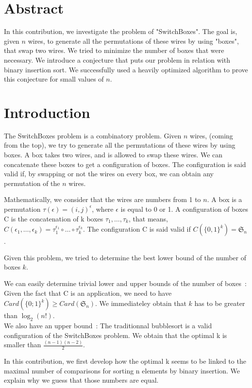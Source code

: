 \documentclass[11pt, a4paper]{article}
\begin{document}
\section{Abstract}
In this contribution, we investigate the problem of "SwitchBoxes".
The goal is, given $n$ wires, to generate all the permutations of these wires by using "boxes",
 that swap two wires. We tried to minimize the number of boxes that were necessary.
We introduce a conjecture that puts our problem in relation with binary insertion sort. 
We successfully used a heavily optimized algorithm to prove this conjecture for small values of $n$.

\section{Introduction}
The SwitchBoxes problem is a combinatory problem. Given $n$ wires, (coming from the top), 
we try to generate all the permutations of these wires by using boxes. 
A box takes two wires, and is allowed to swap these wires. We can concatenate these boxes to get a configuration of boxes.
The configuration is said valid if, by swapping or not the wires on every box, we can obtain any permutation of the $n$ wires.

Mathematically, we consider that the wires are numbers from 1 to $n$. A box is a permutation $\tau(\epsilon) = (i,j)^{\epsilon}$, where $\epsilon$ is equal to 0 or 1.
A configuration of boxes C is the concatenation of k boxes $\tau_1, \ldots, \tau_k$, that means, $C(\epsilon_1, \ldots, \epsilon_k) = \tau_1^{\epsilon_1}\circ\ldots\circ\tau_k^{\epsilon_k}$.
The configuration C is said valid if $C(\{0,1\}^k)= \mathfrak{S}_n$.

Given this problem, we tried to determine the best lower bound of the number of boxes $k$.

We can easily determine trivial lower and upper bounds of the number of boxes~:\\
Given the fact that C is an application, we need to have $Card(\{0;1\}^{k}) \geq Card(\mathfrak{S}_n)$. We immediateley obtain that $k$ has to be greater than $\log_2(n!)$.\\
We also have an upper bound~:
The traditionnal bubblesort is a valid configuration of the SwitchBoxes problem. We obtain that the optimal k is smaller than $\frac{(n-1)(n-2)}{2}$.

In this contribution, we first develop how the optimal k seems to be linked to the maximal number of comparisons for sorting n elements by binary insertion.
We explain why we guess that those numbers are equal.
\end{document}
